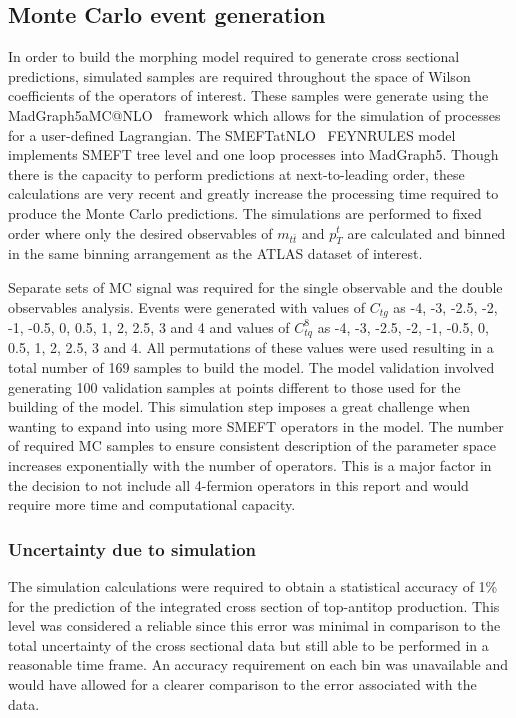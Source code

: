 \documentclass[a4paper,11pt]{article}
\begin{document}
\subsection{Monte Carlo event generation}
In order to build the morphing model required to generate cross sectional predictions, simulated samples are required throughout the space of Wilson coefficients of the operators of interest.
These samples were generate using the MadGraph5\textunderscore aMC@NLO~\cite{Alwall_2014} framework which allows for the simulation of processes for a user-defined Lagrangian.
The SMEFTatNLO~\cite{degrande2020automated} FEYNRULES model implements SMEFT tree level and one loop processes into MadGraph5.
Though there is the capacity to perform predictions at next-to-leading order, these calculations are very recent  and greatly increase the processing time required to produce the Monte Carlo predictions.
The simulations are performed to fixed order where only the desired observables of $m_{t\bar{t}}$ and ${p_{T}^{t}}$ are calculated and binned in the same binning arrangement as the ATLAS dataset of interest.

Separate sets of MC signal was required for the single observable and the double observables analysis.
Events were generated with values of $C_{tg}$ as -4, -3, -2.5, -2, -1, -0.5, 0, 0.5, 1, 2, 2.5, 3 and 4 and values of $C_{tq}^{8}$ as -4, -3, -2.5, -2, -1, -0.5, 0, 0.5, 1, 2, 2.5, 3 and 4. 
All permutations of these values were used resulting in a total number of 169 samples to build the model.
The model validation involved generating 100 validation samples at points different to those used for the building of the model.
This simulation step imposes a great challenge when wanting to expand into using more SMEFT operators in the model.
The number of required MC samples to ensure consistent description of the parameter space increases exponentially with the number of operators.
This is a major factor in the decision to not include all 4-fermion operators in this report and would require more time and computational capacity.

\subsubsection{Uncertainty due to simulation}

The simulation calculations were required to obtain a statistical accuracy of 1\% for the prediction of the integrated cross section of top-antitop production.
This level was considered a reliable since this error was minimal in comparison to the total uncertainty of the cross sectional data but still able to be performed in a reasonable time frame.
An accuracy requirement on each bin was unavailable and would have allowed for a clearer comparison to the error associated with the data.
\end{document}
